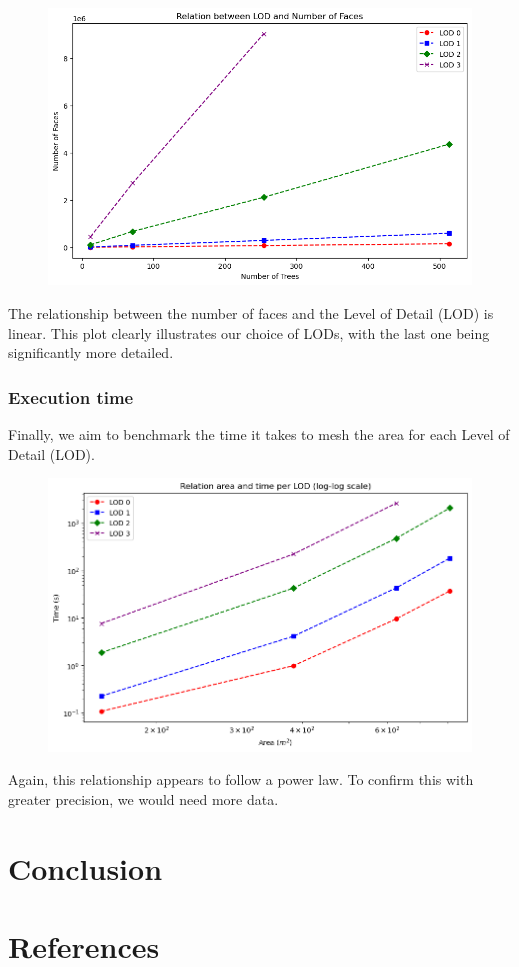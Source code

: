 \documentclass[12pt]{article}
\begin{document}
\begin{figure}[H]
    \centering
    \includegraphics[width=1\textwidth]{images/lod_vs_faces.png}
\end{figure}

The relationship between the number of faces and the Level of Detail (LOD) is
linear. This plot clearly illustrates our choice of LODs, with the last one
being significantly more detailed.

\subsubsection{Execution time}
Finally, we aim to benchmark the time it takes to mesh the area for each Level
of Detail (LOD).

\begin{figure}[H]
    \centering
    \includegraphics[width=1\textwidth]{images/lod_vs_time.png}
\end{figure}

Again, this relationship appears to follow a power law. To confirm this with
greater precision, we would need more data.

\newpage

\section{Conclusion}


\newpage

\section{References}


\end{document}
